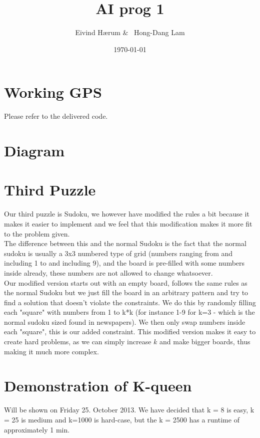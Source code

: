 \documentclass[12pt, a4paper]{article}
\title{AI prog 1}
\author{Eivind Hærum \& \ Hong-Dang Lam}
\date{\today} %
\begin{document}
\maketitle
% 
% 
 
\newpage
\tableofcontents
\newpage
 
\section{Working GPS}
Please refer to the delivered code.

\section{Diagram}

\section{Third Puzzle}
Our third puzzle is Sudoku, we however have modified the rules a bit because it makes it easier to implement and we feel that this modification makes it more fit to the problem given.\\
The difference between this and the normal Sudoku is the fact that the normal sudoku is usually a 3x3 numbered type of grid (numbers ranging from and including 1 to and including 9), and the board is pre-filled with some numbers inside already, these numbers are not allowed to change whatsoever.\\
Our modified version starts out with an empty board, follows the same rules as the normal Sudoku but we just fill the board in an arbitrary pattern and try to find a solution that doesn't violate the constraints. We do this by randomly filling each "square" with numbers from 1 to k*k (for instance 1-9 for k=3 - which is the normal sudoku sized found in newspapers). We then only swap numbers inside each "square", this is our added constraint. This modified version makes it easy to create hard problems, as we can simply increase $k$ and make bigger boards, thus making it much more complex.

\section{Demonstration of K-queen}
Will be shown on Friday 25. October 2013.
We have decided that k = 8 is easy, k = 25 is medium and k=1000 is hard-case, but the k = 2500 has a runtime of approximately 1 min.
\end{document}
